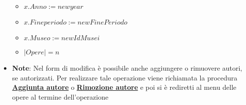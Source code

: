 \begin{itemize}
\begin{itemize}
		\item $x.Anno := newyear$
		\item $x.Fineperiodo := newFinePeriodo$
		\item $x.Museo := newIdMusei$
		\item $|Opere| = n$
	\end{itemize}
	\item \textbf{Note}:
	Nel form di modifica è possibile anche aggiungere o rimuovere autori, se autorizzati.
	Per realizzare tale operazione viene richiamata la procedura \hyperref[AggiuntaAutore]{\textbf{Aggiunta autore}}
	o \hyperref[RimozioneAutoreOpera]{\textbf{Rimozione autore}} e poi si è rediretti al
	menu delle opere al termine dell'operazione
\end{itemize}

